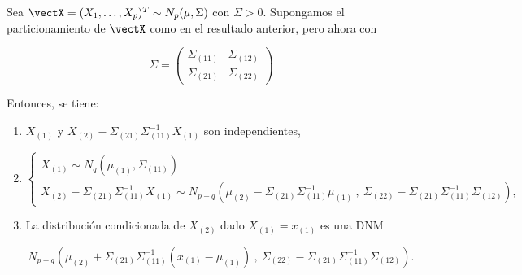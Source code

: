   \begin{nth}
    Sea $\vectX = (X_1, \dots, X_p)^T \sim N_p(\mu,\Sigma)$ con $\Sigma > 0$. Supongamos el particionamiento de $\vectX$ como en el resultado anterior, pero ahora con
    
    \[
\Sigma = \begin{pmatrix}  \Sigma_{(11)} & \Sigma_{(12)} \\ \Sigma_{(21)} & \Sigma_{(22)} \end{pmatrix}
\]

Entonces, se tiene:
\begin{enumerate}
\item $X_{(1)}$ y $X_{(2)} - \Sigma_{(21)} \Sigma_{(11)}^{-1}X_{(1)}$ son independientes, \label{indepitem}
\item \[
  \begin{cases}
    X_{(1)} \sim N_q(\mu_{(1)}, \Sigma_{(11)}) \\
    X_{(2)} - \Sigma_{(21)} \Sigma_{(11)}^{-1}X_{(1)} \sim N_{p-q}\left(\mu_{(2)} - \Sigma_{(21)}\Sigma_{(11)}^{-1}\mu_{(1)} \ , \ \Sigma_{(22)} - \Sigma_{(21)} \Sigma_{(11)}^{-1} \Sigma_{(12)}\right)
  ,\end{cases}
  \] \label{distitem}
  
\item La distribución condicionada de $X_{(2)}$ dado $X_{(1)} = x_{(1)}$ es una DNM
  
  \[
    N_{p-q}\left(\mu_{(2)} + \Sigma_{(21)}\Sigma_{(11)}^{-1}(x_{(1)} - \mu_{(1)}) \ , \ \Sigma_{(22)} - \Sigma_{(21)} \Sigma_{(11)}^{-1} \Sigma_{(12)}\right)
  .\] \label{conditem}
  
\end{enumerate}
  \end{nth}
